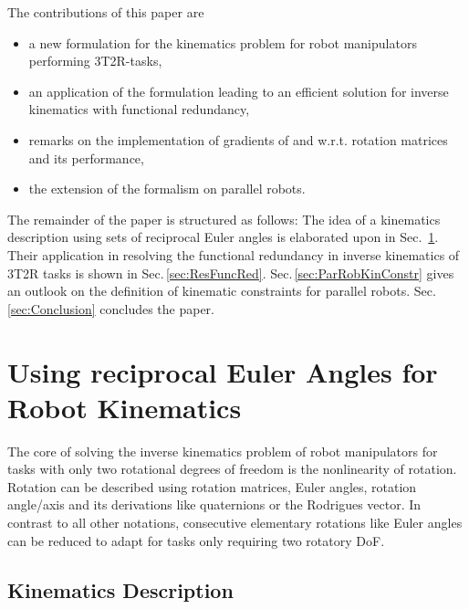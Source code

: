 \documentclass{svproc}
\begin{document}
The contributions of this paper are
\begin{itemize}
    \item a new formulation for the kinematics problem for robot manipulators performing 3T2R-tasks,
    \item an application of the formulation leading to an efficient solution for inverse kinematics with functional redundancy,
    \item remarks on the implementation of gradients of and w.r.t. rotation matrices and its performance,
    \item the extension of the formalism on parallel robots.
\end{itemize}

The remainder of the paper is structured as follows: The idea of a kinematics description using sets of reciprocal Euler angles is elaborated upon in Sec.\, \ref{sec:RecEulAng}.
Their application in resolving the functional redundancy in inverse kinematics of 3T2R tasks is shown in Sec.\,\ref{sec:ResFuncRed}.
Sec.\,\ref{sec:ParRobKinConstr} gives an outlook on the definition of kinematic constraints for parallel robots. 
Sec.\,\ref{sec:Conclusion} concludes the paper.

\section{Using reciprocal Euler Angles for Robot Kinematics}
\label{sec:RecEulAng}

The core of solving the inverse kinematics problem of robot manipulators for tasks with only two rotational degrees of freedom is the nonlinearity of rotation.
Rotation can be described using rotation matrices, Euler angles, rotation angle/axis and its derivations like quaternions or the Rodrigues vector.
In contrast to all other notations, consecutive elementary rotations like Euler angles can be reduced to adapt for tasks only requiring two rotatory DoF.

\subsection{Kinematics Description}
\label{sec:RecEulAng_KinDesc}
\end{document}
